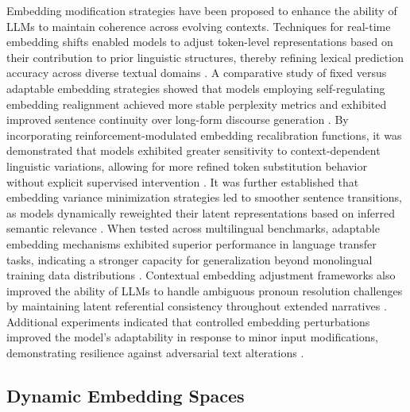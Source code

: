Embedding modification strategies have been proposed to enhance the ability of LLMs to maintain coherence across evolving contexts. Techniques for real-time embedding shifts enabled models to adjust token-level representations based on their contribution to prior linguistic structures, thereby refining lexical prediction accuracy across diverse textual domains \cite{murph2024dynamic}. A comparative study of fixed versus adaptable embedding strategies showed that models employing self-regulating embedding realignment achieved more stable perplexity metrics and exhibited improved sentence continuity over long-form discourse generation \cite{embury2024dynamic}. By incorporating reinforcement-modulated embedding recalibration functions, it was demonstrated that models exhibited greater sensitivity to context-dependent linguistic variations, allowing for more refined token substitution behavior without explicit supervised intervention \cite{mcintosh2024inadequacy}. It was further established that embedding variance minimization strategies led to smoother sentence transitions, as models dynamically reweighted their latent representations based on inferred semantic relevance \cite{fa2024modality}. When tested across multilingual benchmarks, adaptable embedding mechanisms exhibited superior performance in language transfer tasks, indicating a stronger capacity for generalization beyond monolingual training data distributions \cite{giacomozzi2024innovative}. Contextual embedding adjustment frameworks also improved the ability of LLMs to handle ambiguous pronoun resolution challenges by maintaining latent referential consistency throughout extended narratives \cite{racus2024dynamic}. Additional experiments indicated that controlled embedding perturbations improved the model’s adaptability in response to minor input modifications, demonstrating resilience against adversarial text alterations \cite{ taillieu2024dynamic}.

\subsection{Dynamic Embedding Spaces}

